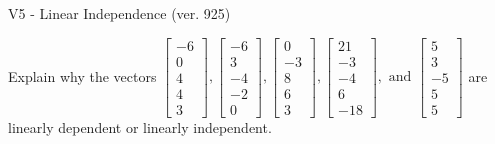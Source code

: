 \begin{exercise}
  \begin{exerciseTitle}V5 - Linear Independence (ver. 925)\end{exerciseTitle}
  \begin{exerciseStatement}
    Explain why the vectors \(\left[\begin{array}{r}
-6 \\
0 \\
4 \\
4 \\
3
\end{array}\right] , \left[\begin{array}{r}
-6 \\
3 \\
-4 \\
-2 \\
0
\end{array}\right] , \left[\begin{array}{r}
0 \\
-3 \\
8 \\
6 \\
3
\end{array}\right] , \left[\begin{array}{r}
21 \\
-3 \\
-4 \\
6 \\
-18
\end{array}\right] , \text{ and } \left[\begin{array}{r}
5 \\
3 \\
-5 \\
5 \\
5
\end{array}\right]\) are linearly dependent or linearly independent.	



\end{exerciseStatement}
\end{exercise}
